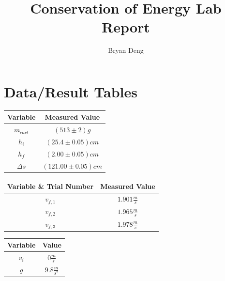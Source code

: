 \documentclass{article}
\title{Conservation of Energy Lab Report}
\author{Bryan Deng}
\begin{document}
\maketitle
\newpage
\tableofcontents
\newpage

\section{Data/Result Tables}

\begin{center}
    \begin{tabular}{|c|c|}
        \hline
        Variable   & Measured Value        \\
        \hline \hline
        $m_{cart}$ & $(513 \pm 2)g$        \\
        \hline
        $h_i$      & $(25.4 \pm 0.05)cm$   \\
        \hline
        $h_f$      & $(2.00 \pm 0.05)cm$   \\
        \hline
        $\Delta s$ & $(121.00 \pm 0.05)cm$ \\
        \hline
    \end{tabular}
\end{center}

\begin{center}
    \begin{tabular}{|c|c|}
        \hline
        Variable \& Trial Number & Measured Value      \\
        \hline \hline
        $v_{f,1}$                & $1.901 \frac{m}{s}$ \\
        \hline
        $v_{f,2}$                & $1.965 \frac{m}{s}$ \\
        \hline
        $v_{f,3}$                & $1.978 \frac{m}{s}$ \\
        \hline
    \end{tabular}
\end{center}

\begin{center}
    \begin{tabular}{|c|c|}
        \hline
        Variable & Value               \\
        \hline \hline
        $v_i$    & $0 \frac{m}{s}$     \\
        \hline
        $g$      & $9.8 \frac{m}{s^2}$ \\
        \hline
    \end{tabular}
\end{center}
\end{document}
